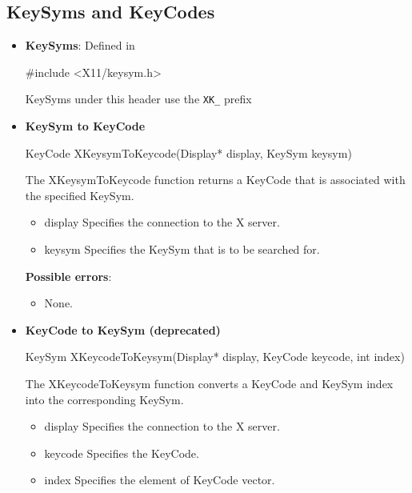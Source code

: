 \documentclass{report}
\begin{document}
    \subsection{KeySyms and KeyCodes}
    \begin{itemize}
        \item \textbf{KeySyms}: Defined in 
            \bigbreak \noindent 
            \begin{cppcode}
            #include <X11/keysym.h>
            \end{cppcode}
            \bigbreak \noindent 
            KeySyms under this header use the \texttt{XK\_} prefix

        \item \textbf{KeySym to KeyCode}
            \begin{cppcode}
            KeyCode XKeysymToKeycode(Display* display, KeySym keysym)
            \end{cppcode}
            \bigbreak \noindent
            The XKeysymToKeycode function returns a KeyCode that is associated with the specified KeySym.
            \begin{itemize}
                \item display Specifies the connection to the X server.
                \item keysym Specifies the KeySym that is to be searched for.
            \end{itemize}
            \textbf{Possible errors}:
            \begin{itemize}
                \item None.
            \end{itemize}
        \item \textbf{KeyCode to KeySym (deprecated)}
            \bigbreak \noindent 
            \begin{cppcode}
                KeySym XKeycodeToKeysym(Display* display, KeyCode keycode, int index)
            \end{cppcode}
            \bigbreak \noindent
            The XKeycodeToKeysym function converts a KeyCode and KeySym index into the corresponding KeySym.
            \begin{itemize}
                \item display Specifies the connection to the X server.
                \item keycode Specifies the KeyCode.
                \item index Specifies the element of KeyCode vector.
            \end{itemize}

\end{itemize}
\end{document}
